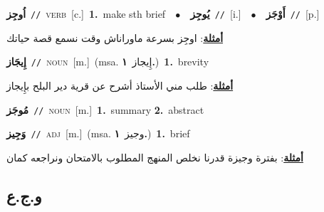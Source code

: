 \documentclass[10pt,a4paper,twoside]{article} %
\begin{document}
\begin{multicols}{2}
{{{{{{{{{{\setlength\topsep{0pt}\textbf{\foreignlanguage{arabic}{اُوجِز}}\ {\color{gray}\texttt{//}\color{black}}\ \textsc{verb}\ [c.]\ \textbf{1.}~make sth brief\ \ $\bullet$\ \ \setlength\topsep{0pt}\textbf{\foreignlanguage{arabic}{يُوجِز}}\ {\color{gray}\texttt{//}\color{black}}\ [i.]\ \ $\bullet$\ \ \setlength\topsep{0pt}\textbf{\foreignlanguage{arabic}{أَوْجَز}}\ {\color{gray}\texttt{//}\color{black}}\ [p.]\  \begin{flushright}\color{gray}\foreignlanguage{arabic}{\textbf{\underline{\foreignlanguage{arabic}{أمثلة}}}: اوجِز بسرعة ماوراناش وقت نسمع قصة حياتك}\end{flushright}\color{black}} \vspace{2mm}

{\setlength\topsep{0pt}\textbf{\foreignlanguage{arabic}{إِيجَاز}}\ {\color{gray}\texttt{//}\color{black}}\ \textsc{noun}\ [m.]\ \color{gray}(msa. \foreignlanguage{arabic}{إِيجاز}~\foreignlanguage{arabic}{\textbf{١.}})\color{black}\ \textbf{1.}~brevity\  \begin{flushright}\color{gray}\foreignlanguage{arabic}{\textbf{\underline{\foreignlanguage{arabic}{أمثلة}}}: طلب مني الأستاذ أشرح عن قرية دير البلح بإِيجاز}\end{flushright}\color{black}} \vspace{2mm}

{\setlength\topsep{0pt}\textbf{\foreignlanguage{arabic}{مُوجَز}}\ {\color{gray}\texttt{//}\color{black}}\ \textsc{noun}\ [m.]\ \textbf{1.}~summary  \textbf{2.}~abstract\ 

{\setlength\topsep{0pt}\textbf{\foreignlanguage{arabic}{وَجِيز}}\ {\color{gray}\texttt{//}\color{black}}\ \textsc{adj}\ [m.]\ \color{gray}(msa. \foreignlanguage{arabic}{وجيز}~\foreignlanguage{arabic}{\textbf{١.}})\color{black}\ \textbf{1.}~brief\  \begin{flushright}\color{gray}\foreignlanguage{arabic}{\textbf{\underline{\foreignlanguage{arabic}{أمثلة}}}: بفترة وجيزة قدرنا نخلص المنهج المطلوب بالامتحان ونراجعه كمان}\end{flushright}\color{black}} \vspace{2mm}

\vspace{-3mm}
\subsection*{\color{blue}\foreignlanguage{arabic}{و.ج.ع}\color{blue}{}} 

}}}}}}}}}}
\end{multicols}
\end{document}
